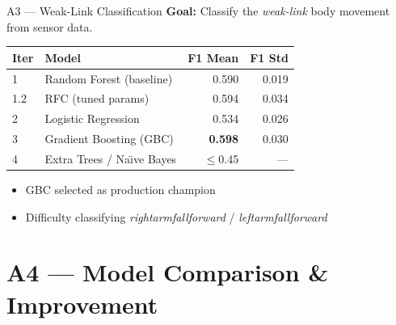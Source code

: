 \documentclass{beamer}
\begin{document}
\begin{frame}{A3 --- Weak-Link Classification}
    \textbf{Goal:} Classify the \textit{weak-link} body movement from sensor data.
    \vspace{0.5em}
    \begin{table}
        \small
        \begin{tabular}{l l r r}
            \toprule
            \textbf{Iter} & \textbf{Model} & \textbf{F1 Mean} & \textbf{F1 Std} \\
            \midrule
            1   & Random Forest (baseline)       & 0.590 & 0.019 \\
            1.2 & RFC (tuned params)             & 0.594 & 0.034 \\
            2   & Logistic Regression            & 0.534 & 0.026 \\
            3   & Gradient Boosting (GBC)        & \textbf{0.598} & 0.030 \\
            4   & Extra Trees / Na\"{\i}ve Bayes & $\leq$0.45 & --- \\
            \bottomrule
        \end{tabular}
    \end{table}
    \vspace{0.5em}
    \begin{itemize}
        \item GBC selected as production champion
        \item Difficulty classifying \textit{rightarmfallforward} / \textit{leftarmfallforward}
    \end{itemize}
\end{frame}

\section{A4 --- Model Comparison \& Improvement}
\end{document}

